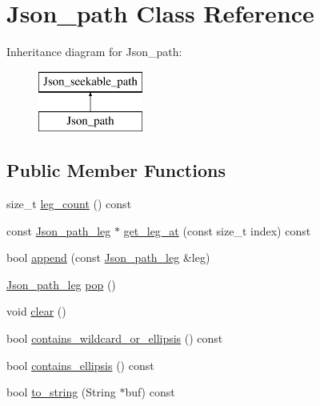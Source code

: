 \hypertarget{classJson__path}{}\section{Json\+\_\+path Class Reference}
\label{classJson__path}
Inheritance diagram for Json\+\_\+path\+:\begin{figure}[H]
\begin{center}
\leavevmode
\includegraphics[height=2.000000cm]{classJson__path}
\end{center}
\end{figure}
\subsection*{Public Member Functions}
\begin{DoxyCompactItemize}
\item 
size\+\_\+t \mbox{\hyperlink{classJson__path_a22b4d53c90300f917ab7abaedad8bfaa}{leg\+\_\+count}} () const
\item 
const \mbox{\hyperlink{classJson__path__leg}{Json\+\_\+path\+\_\+leg}} $\ast$ \mbox{\hyperlink{classJson__path_a33038f8cae772c5f4c8333be94389b46}{get\+\_\+leg\+\_\+at}} (const size\+\_\+t index) const
\item 
bool \mbox{\hyperlink{classJson__path_a72997695493718ef73ece75087713d64}{append}} (const \mbox{\hyperlink{classJson__path__leg}{Json\+\_\+path\+\_\+leg}} \&leg)
\item 
\mbox{\hyperlink{classJson__path__leg}{Json\+\_\+path\+\_\+leg}} \mbox{\hyperlink{classJson__path_aaa77ca94d28474ce3614aa692bd1edbe}{pop}} ()
\item 
void \mbox{\hyperlink{classJson__path_a7c9ebc624af2f9d494a7fbcdc3c92458}{clear}} ()
\item 
bool \mbox{\hyperlink{classJson__path_a4c0337db67e99b1fa92862afb06c1517}{contains\+\_\+wildcard\+\_\+or\+\_\+ellipsis}} () const
\item 
bool \mbox{\hyperlink{classJson__path_a6f1be7ddf18da788f48e031a7b65c5f3}{contains\+\_\+ellipsis}} () const
\item 
bool \mbox{\hyperlink{classJson__path_a894bbe4696c914f7274325b202fd6ccf}{to\+\_\+string}} (String $\ast$buf) const
\end{DoxyCompactItemize}
